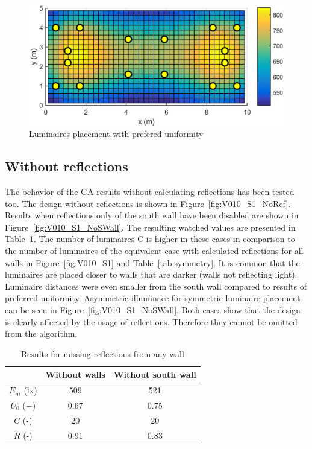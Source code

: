 \begin{figure}[tb]
  \centering
  \includegraphics[width=\columnwidth]{../Vysledky/MSTR_SLB_4x18W_5G4_Fit2_U_V010_S1}
  \caption{Luminaires placement with prefered uniformity}
  \label{fig:V010_S1_U}
\end{figure}

\subsection{Without reflections}

The behavior of the GA results without calculating reflections has been tested too. The design without reflections is shown in Figure~\ref{fig:V010_S1_NoRef}. Results when reflections only of the south wall have been disabled are shown in Figure~\ref{fig:V010_S1_NoSWall}. The resulting watched values are presented in Table~\ref{tab:noRef}. The number of luminaires C is higher in these cases in comparison to the number of luminaires of the equivalent case with calculated reflections for all walls in Figure~\ref{fig:V010_S1} and Table~\ref{tab:symmetry}. It is common that the luminaires are placed closer to walls that are darker (walls not reflecting light). Luminaire distances were even smaller from the south wall compared to results of preferred uniformity. Asymmetric illuminace for symmetric luminaire placement can be seen in Figure~\ref{fig:V010_S1_NoSWall}. Both cases show that the design is clearly affected by the usage of reflections. Therefore they cannot be omitted from the algorithm.

\begin{table}[tb]
	\renewcommand{\arraystretch}{1.8}
	\caption{Results for missing reflections from any wall}
 	\label{tab:noRef}
	\centering
  \begin{tabular}{| c | c | c |}
    \hline
    & \textbf{Without walls} & \textbf{Without south wall} \\
    \hline
    $\overline{E}_{m}$ (lx) & 509 & 521 \\
    \hline
		$U_0$ ($-$)& 0.67 & 0.75 \\
    \hline
		$C$ (-) & 20 & 20 \\
	\hline
		$R$ (-) & 0.91 & 0.83 \\
  \hline
  \end{tabular}
\end{table}


